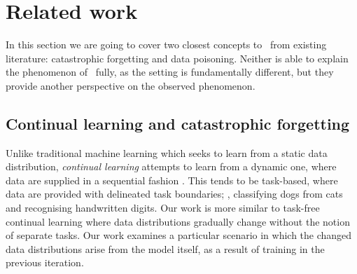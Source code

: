 \section{Related work}
In this section we are going to cover two closest concepts to \md~from existing literature: catastrophic forgetting and data poisoning. Neither is able to explain the phenomenon of \md~fully, as the setting is fundamentally different, but they provide another perspective on the observed phenomenon. 
\subsection{Continual learning and catastrophic forgetting}
Unlike traditional machine learning which seeks to learn from a static data distribution, \emph{continual learning} attempts to learn from a dynamic one, where data are supplied in a sequential fashion \citep{van2019three}. This tends to be task-based, where data are provided with delineated task boundaries; \eg, classifying dogs from cats and recognising handwritten digits. Our work is more similar to task-free continual learning \citep{aljundi2019task} where data distributions gradually change without the notion of separate tasks. Our work examines a particular scenario in which the changed data distributions arise from the model itself, as a result of training in the previous iteration.




